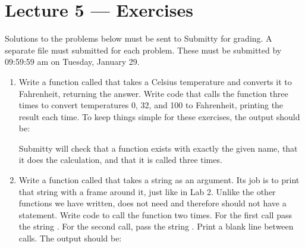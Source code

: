 \documentclass[letterpaper,10pt,english]{sphinxmanual}
\begin{document}
\chapter{Lecture 5 — Exercises}
\label{\detokenize{lecture_notes/lec05_functions2_exercises/exercises:lecture-5-exercises}}\label{\detokenize{lecture_notes/lec05_functions2_exercises/exercises::doc}}
Solutions to the problems below must be sent to Submitty for grading.
A separate file must submitted for each problem. These must be
submitted by 09:59:59 am on Tuesday, January 29.
\begin{enumerate}
\def\theenumi{\arabic{enumi}}
\def\labelenumi{\theenumi .}
\makeatletter\def\p@enumii{\p@enumi \theenumi .}\makeatother
\item {} 
Write a function called  that takes a Celsius
temperature and converts it to Fahrenheit, returning the answer.
Write code that calls the function three times to convert
temperatures 0, 32, and 100 to Fahrenheit, printing the result each
time.  To keep things simple for these exercises, the output should
be:

\begin{sphinxVerbatim}[commandchars=\\\{\}]
  
  
  
\end{sphinxVerbatim}

Submitty will check that a function exists with exactly the given
name, that it does the calculation, and that it is called three
times.

\item {} 
Write a function called  that takes a string as an
argument.  Its job is to print that string with a frame around it,
just like in Lab 2.  Unlike the other functions we have written,
 does not need and therefore should not have a
 statement.  Write code to call the function two times.
For the first call pass the string .  For the
second call, pass the string .  Print a blank line between
calls.  The output should be:

\begin{sphinxVerbatim}[commandchars=\\\{\}]
   


\end{sphinxVerbatim}
\end{enumerate}
\end{document}
